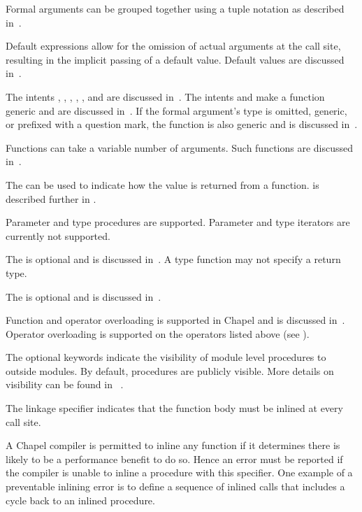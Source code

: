 Formal arguments can be grouped together using a tuple notation as
described in~.

Default expressions allow for the omission of actual arguments at the
call site, resulting in the implicit passing of a default value.
Default values are discussed in~.

The intents , , , , ,  and  are discussed
in~.  The intents  and  make a
function generic and are discussed in~.  If
the formal argument's type is omitted, generic, or prefixed with a
question mark, the function is also generic and is discussed
in~.

Functions can take a variable number of arguments.  Such functions are
discussed in~.

The  can be used to indicate how the value is returned from
a function.   is described further in .

\begin{openissue}
Parameter and type procedures are supported. Parameter and type
iterators are currently not supported.
\end{openissue}

The  is optional and is discussed in~.
A type function may not specify a return type.

The  is optional and is discussed
in~.

Function and operator overloading is supported in Chapel and is
discussed in~.
Operator overloading is supported on the operators listed
above (see ).

The optional  keywords indicate the visibility
of module level procedures to outside modules.  By default, procedures are
publicly visible.  More details on visibility can be found in
~.

The linkage specifier  indicates that the function body must
be inlined at every call site.

\begin{rationale}
A Chapel compiler is permitted to inline any function if it determines
there is likely to be a performance benefit to do so.  Hence an error
must be reported if the compiler is unable to inline a procedure with
this specifier.  One example of a preventable inlining error is to
define a sequence of inlined calls that includes a cycle back to an
inlined procedure.
\end{rationale}

